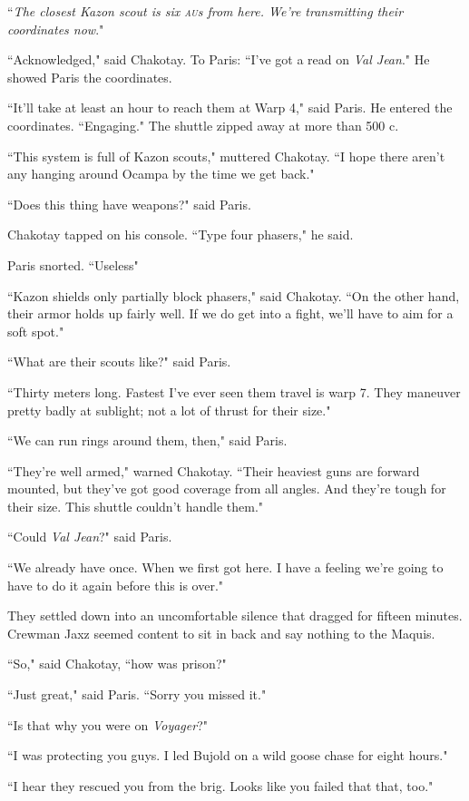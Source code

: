 \documentclass[twoside,letterpaper,12pt]{memoir}
\begin{document}
``\textit{The closest Kazon scout is six \textsc{au}s from here. We're transmitting their coordinates now}."

``Acknowledged," said Chakotay. To Paris: ``I've got a read on \textit{Val Jean}." He showed Paris the coordinates.

``It'll take at least an hour to reach them at Warp 4," said Paris. He entered the coordinates. ``Engaging." The shuttle zipped away at more than 500 c.

``This system is full of Kazon scouts," muttered Chakotay. ``I hope there aren't any hanging around Ocampa by the time we get back."

``Does this thing have weapons?" said Paris.

Chakotay tapped on his console. ``Type four phasers," he said.

Paris snorted. ``Useless"

``Kazon shields only partially block phasers," said Chakotay. ``On the other hand, their armor holds up fairly well. If we do get into a fight, we'll have to aim for a soft spot."

``What are their scouts like?" said Paris.

``Thirty meters long. Fastest I've ever seen them travel is warp 7. They maneuver pretty badly at sublight; not a lot of thrust for their size."

``We can run rings around them, then," said Paris.

``They're well armed," warned Chakotay. ``Their heaviest guns are forward mounted, but they've got good coverage from all angles. And they're tough for their size. This shuttle couldn't handle them."

``Could \textit{Val Jean}?" said Paris.

``We already have once. When we first got here. I have a feeling we're going to have to do it again before this is over."

They settled down into an uncomfortable silence that dragged for fifteen minutes. Crewman Jaxz seemed content to sit in back and say nothing to the Maquis.

``So," said Chakotay, ``how was prison?"

``Just great," said Paris. ``Sorry you missed it."

``Is that why you were on \textit{Voyager}?"

``I was protecting you guys. I led Bujold on a wild goose chase for eight hours."

``I hear they rescued you from the brig. Looks like you failed that that, too."
\end{document}
